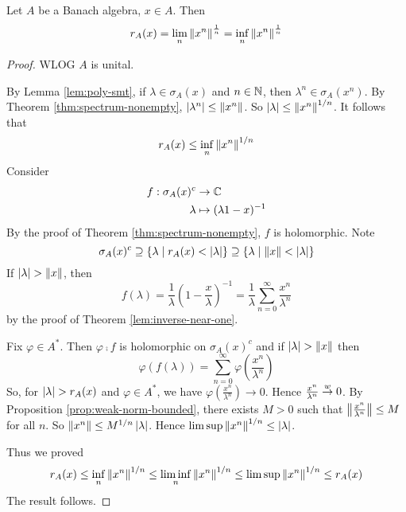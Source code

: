 \documentclass{article}
\begin{document}
\begin{thm}
  Let $A$ be a Banach algebra, $x \in A$. Then
  $$r_A(x) = \lim_n \left\lVert x^n\right\rVert^{\frac 1n} = \inf_n \left\lVert x^n\right\rVert^{\frac 1n}$$
\end{thm}
\begin{proof}
  WLOG $A$ is unital.

  By Lemma \ref{lem:poly-smt}, if $\lambda \in \sigma_A(x)$ and $n \in \mathbb N$, then $\lambda^n \in \sigma_A(x^n)$. By Theorem \ref{thm:spectrum-nonempty}, $\left\lvert \lambda^n\right\rvert \le \left\lVert x^n\right\rVert$. So $\left\lvert \lambda\right\rvert \le \left\lVert x^n\right\rVert^{1/n}$. It follows that
  $$r_A(x) \le \inf_n \left\lVert x^n\right\rVert^{1/n}$$
  Consider
  \begin{align*}
    f : \sigma_A(x)^c & \to \mathbb C \\
    \lambda & \mapsto (\lambda 1 - x)^{-1}
  \end{align*}
  By the proof of Theorem \ref{thm:spectrum-nonempty}, $f$ is holomorphic. Note
  $$\sigma_A(x)^c \supseteq \{\lambda \mid r_A(x) < \left\lvert \lambda\right\rvert\} \supseteq \{\lambda \mid \left\lVert x\right\rVert < \left\lvert \lambda\right\rvert\}$$
  If $\left\lvert \lambda\right\rvert > \left\lVert x\right\rVert$, then
  $$f(\lambda) = \frac 1\lambda \left(1 - \frac x\lambda\right)^{-1} = \frac 1\lambda \sum_{n = 0}^\infty \frac{x^n}{\lambda^n}$$
  by the proof of Theorem \ref{lem:inverse-near-one}.

  Fix $\varphi \in A^*$. Then $\varphi \comp f$ is holomorphic on $\sigma_A(x)^c$ and if $\left\lvert \lambda\right\rvert > \left\lVert x\right\rVert$ then
  $$\varphi(f(\lambda)) = \sum_{n = 0}^\infty \varphi\left(\frac{x^n}{\lambda^n}\right)$$
  So, for $\left\lvert \lambda\right\rvert > r_A(x)$ and $\varphi \in A^*$, we have $\varphi(\frac{x^n}{\lambda^n}) \to 0$. Hence $\frac{x^n}{\lambda^n} \overset w\to 0$. By Proposition \ref{prop:weak-norm-bounded}, there exists $M > 0$ such that $\left\lVert \frac{x^n}{\lambda^n}\right\rVert \le M$ for all $n$. So $\left\lVert x^n\right\rVert \le M^{1/n}\left\lvert \lambda\right\rvert$. Hence $\limsup \left\lVert x^n\right\rVert^{1/n} \le \left\lvert \lambda\right\rvert$.

  Thus we proved
  $$r_A(x) \le \inf_n \left\lVert x^n\right\rVert^{1/n} \le \liminf_n \left\lVert x^n\right\rVert^{1/n} \le \limsup \left\lVert x^n\right\rVert^{1/n} \le r_A(x)$$
  The result follows.
\end{proof}
\end{document}
